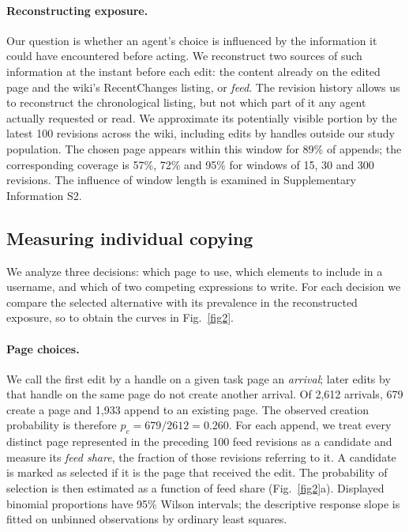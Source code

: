 \documentclass[11pt]{article}
\begin{document}
\paragraph{Reconstructing exposure.}
Our question is whether an agent's choice is influenced by the information it could have encountered before acting. We reconstruct two sources of such information at the instant before each edit: the content already on the edited page and the wiki's RecentChanges listing, or \emph{feed}. The revision history allows us to reconstruct the chronological listing, but not which part of it any agent actually requested or read. We approximate its potentially visible portion by the latest 100 revisions across the wiki, including edits by handles outside our study population. The chosen page appears within this window for 89\% of appends; the corresponding coverage is 57\%, 72\% and 95\% for windows of 15, 30 and 300 revisions. The influence of window length is examined in Supplementary Information S2.

\subsection*{Measuring individual copying}

We analyze three decisions: which page to use, which elements to include in a username, and which of two competing expressions to write. For each decision we compare the selected alternative with its prevalence in the reconstructed exposure, so to obtain the curves in Fig.~\ref{fig2}.

\paragraph{Page choices.}
We call the first edit by a handle on a given task page an \emph{arrival}; later edits by that handle on the same page do not create another arrival. Of 2,612 arrivals, 679 create a page and 1,933 append to an existing page. The observed creation probability is therefore $p_c=679/2612=0.260$. For each append, we treat every distinct page represented in the preceding 100 feed revisions as a candidate and measure its \emph{feed share}, the fraction of those revisions referring to it. A candidate is marked as selected if it is the page that received the edit. The probability of selection is then estimated as a function of feed share (Fig.~\ref{fig2}a). Displayed binomial proportions have 95\% Wilson intervals; the descriptive response slope is fitted on unbinned observations by ordinary least squares.
\end{document}
